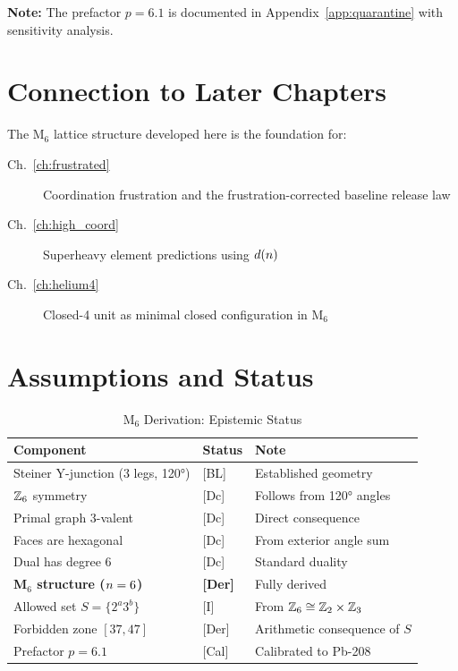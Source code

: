 \textbf{Note:} The prefactor $p = 6.1$ is documented in Appendix~\ref{app:quarantine}
with sensitivity analysis.

\section{Connection to Later Chapters}
\label{sec:M6:connections}

The M$_6$ lattice structure developed here is the foundation for:

\begin{description}
    \item[Ch.~\ref{ch:frustrated}] Coordination frustration and the
        frustration-corrected baseline release law
    \item[Ch.~\ref{ch:high_coord}] Superheavy element predictions using $d(n)$
    \item[Ch.~\ref{ch:helium4}] Closed-4 unit as minimal closed configuration in M$_6$
\end{description}

\section{Assumptions and Status}
\label{sec:M6:assumptions}

\begin{table}[htbp]
\centering
\caption{M$_6$ Derivation: Epistemic Status}
\label{tab:M6:status}
\begin{tabular}{lll}
    \toprule
    Component & Status & Note \\
    \midrule
    Steiner Y-junction (3 legs, 120°) & [BL] & Established geometry \\
    $\mathbb{Z}_6$ symmetry & [Dc] & Follows from 120° angles \\
    Primal graph 3-valent & [Dc] & Direct consequence \\
    Faces are hexagonal & [Dc] & From exterior angle sum \\
    Dual has degree 6 & [Dc] & Standard duality \\
    \textbf{M$_6$ structure ($n = 6$)} & \textbf{[Der]} & Fully derived \\
    \midrule
    Allowed set $S = \{2^a 3^b\}$ & [I] & From $\mathbb{Z}_6 \cong \mathbb{Z}_2 \times \mathbb{Z}_3$ \\
    Forbidden zone $[37, 47]$ & [Der] & Arithmetic consequence of $S$ \\
    Prefactor $p = 6.1$ & [Cal] & Calibrated to Pb-208 \\
    \bottomrule
\end{tabular}
\end{table}

